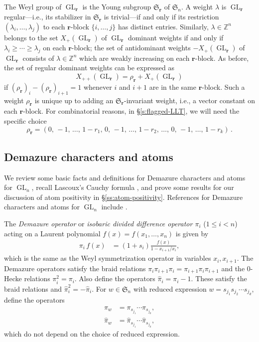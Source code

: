 \documentclass[12pt]{amsart}
\theoremstyle{definition}
\theoremstyle{remark}
\newcommand{\ZZ}{{\mathbb Z}}
\newcommand{\rr}{{\mathbf r}}
\newcommand{\Dem}{\pi }
\newcommand{\DemAt}{\widehat{\pi}}
\newcommand{\Sfrak}{{\mathfrak S}}
\DeclareMathOperator{\GL}{GL}
\begin{document}
The Weyl group of $\GL _{\rr }$ is the Young subgroup $\Sfrak _{\rr }$
of $\Sfrak _{n}$.  A weight $\lambda $ is $\GL _{\rr }$
regular---i.e., its stabilizer in $\Sfrak _{\rr }$ is trivial---if
and only if its restriction $(\lambda _{i},\ldots,\lambda _{j})$ to each $\rr
$-block $\{i,\ldots,j \}$ has distinct entries.  Similarly, $\lambda \in \ZZ^n$
belongs to the set $X_{+}(\GL _{\rr })$ of $\GL _{\rr }$ dominant
weights if and only if $\lambda _{i}\geq \cdots \geq \lambda _{j}$ on each $\rr
$-block; the set of antidominant weights  $-X_+(\GL_\rr)$ of  $\GL_\rr$ consists of  $\lambda \in \ZZ^n$
which are weakly increasing on each  $\rr$-block.
As before, the set of regular dominant weights can be
expressed as
\begin{equation}\label{e:X++(GLr)}
X_{++}(\GL _{\rr }) = \rho _{\rr } + X_{+}(\GL _{\rr })
\end{equation}
if $(\rho _{\rr })_{i} - (\rho _{\rr })_{i+1}= 1$ whenever $i$ and $i+1$ are in the same $\rr $-block.
Such a
weight $\rho _{\rr }$ is unique up to adding an $\Sfrak _{\rr
}$-invariant weight, i.e., a vector constant on each $\rr $-block.
For combinatorial reasons, in \S \ref{s:flagged-LLT}, we will need the
specific choice
\begin{equation}\label{e:rho-r-preview}
\rho _{\rr } = (0,\, -1,\, \ldots,\, 1-r_{1},\, 0,\, -1,\, \ldots,\,
1-r_{2},\, \ldots, \, 0,\, -1,\, \ldots,\, 1-r_{k}) \,.
\end{equation}


\subsection{Demazure characters and atoms}
\label{ss:Demazure}

We review some basic facts and definitions for Demazure characters and
atoms for $\GL_n$, recall Lascoux's Cauchy formula
\cite{LascouxCrystal}, and prove some results for our discussion of
atom positivity in \S \ref{ss:atom-positivity}.  References for
Demazure characters and atoms for $\GL_n$ include
\cite{FuLascoux09,Lascoux12,RS}.

The \emph{Demazure operator} or \emph{isobaric divided difference
operator $\Dem_i$} ($1 \le i < n$) acting on a Laurent polynomial
$f(x) = f(x_1,\dots, x_n)$ is given by
\begin{align}
\Dem_i \, f(x) &= (1+s_{i})\frac{f(x)}{1- x_{i+1}/x_i},
\end{align}
which is the same as the Weyl symmetrization operator
in variables  $x_i, x_{i+1}$.
The Demazure operators satisfy the braid relations $\Dem_i \Dem_{i+1}
\Dem_i = \Dem_{i+1} \Dem_{i} \Dem_{i+1}$ and the 0-Hecke relations
$\Dem_i^2 = \Dem_i$.  Also define the operators $\DemAt_i = \Dem_i -
1$.  These satisfy the braid relations and $\DemAt_i^2 = -\DemAt_i$.
For $w\in \Sfrak_n$ with reduced expression $w = s_{j_1}s_{j_2}\cdots
s_{j_d}$, define the operators
\begin{align}
\label{e Demw def}
\Dem_w & = \Dem_{s_{j_1}} \cdots \Dem_{s_{j_d}}, \\
\label{e DemAtw def}
\DemAt_w & = \DemAt_{s_{j_1}} \cdots \DemAt_{s_{j_d}},
\end{align}
which do not depend on the choice of reduced expression.
\end{document}
